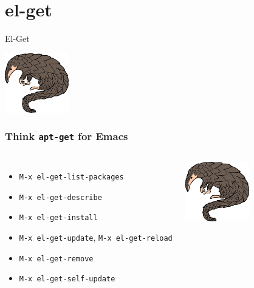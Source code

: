 \documentclass{beamer}
\begin{document}
\section{el-get}

\begin{frame}[fragile] 
  \begin{center}
    \Huge{El-Get}
    \vfill

    \includegraphics[height=7em]{el-get-logo.png}
  \end{center}
\end{frame}

\begin{frame}
  \frametitle{Think \texttt{apt-get} for Emacs}

  \vfill

\begin{columns}

  \begin{itemize}
   \item \texttt{M-x el-get-list-packages}
   \item \texttt{M-x el-get-describe}
   \item \texttt{M-x el-get-install}
   \item \texttt{M-x el-get-update}, \texttt{M-x el-get-reload}
   \item \texttt{M-x el-get-remove}
   \item \texttt{M-x el-get-self-update}
  \end{itemize}

  \begin{center}
    \includegraphics[height=7em]{el-get-logo.png}
  \end{center}
\end{columns}
\end{frame}
\end{document}
